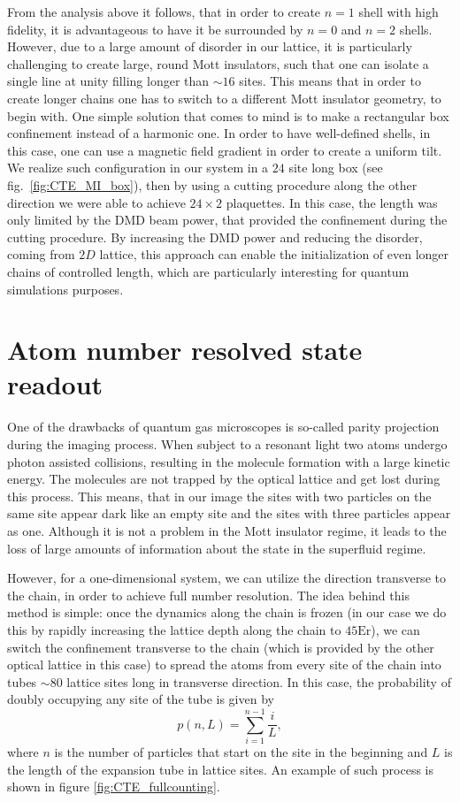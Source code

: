 From the analysis above it follows, that in order to create $n=1$ shell with high fidelity, it is advantageous to have it be surrounded by $n=0$ and $n=2$ shells. However, due to a large amount of disorder in our lattice, it is particularly challenging to create large, round Mott insulators, such that one can isolate a single line at unity filling longer than $\sim 16$ sites. This means that in order to create longer chains one has to switch to a different Mott insulator geometry, to begin with. One simple solution that comes to mind is to make a rectangular box confinement instead of a harmonic one. In order to have well-defined shells, in this case, one can use a magnetic field gradient in order to create a uniform tilt. We realize such configuration in our system in a $24$ site long box (see fig.~\ref{fig:CTE_MI_box}), then by using a cutting procedure along the other direction we were able to achieve $24\times 2$ plaquettes. In this case, the length was only limited by the DMD beam power, that provided the confinement during the cutting procedure. By increasing the DMD power and reducing the disorder, coming from $2D$ lattice, this approach can enable the initialization of even longer chains of controlled length, which are particularly interesting for quantum simulations purposes.

\section{Atom number resolved state readout}

One of the drawbacks of quantum gas microscopes is so-called parity projection during the imaging process. When subject to a resonant light two atoms undergo photon assisted collisions, resulting in the molecule formation with a large kinetic energy. The molecules are not trapped by the optical lattice and get lost during this process. This means, that in our image the sites with two particles on the same site appear dark like an empty site and the sites with three particles appear as one. Although it is not a problem in the Mott insulator regime, it leads to the loss of large amounts of information about the state in the superfluid regime. 

However, for a one-dimensional system, we can utilize the direction transverse to the chain, in order to achieve full number resolution. The idea behind this method is simple: once the dynamics along the chain is frozen (in our case we do this by rapidly increasing the lattice depth along the chain to $45 \textrm{Er}$), we can switch the confinement transverse to the chain (which is provided by the other optical lattice in this case) to spread the atoms from every site of the chain into tubes $\sim 80$ lattice sites long in transverse direction. In this case, the probability of doubly occupying any site of the tube is given by
\begin{equation}
p(n,L) = \sum_{i=1}^{n-1}\frac{i}{L},
\end{equation}
where $n$ is the number of particles that start on the site in the beginning and $L$ is the length of the expansion tube in lattice sites. An example of such process is shown in figure \ref{fig:CTE_fullcounting}.

